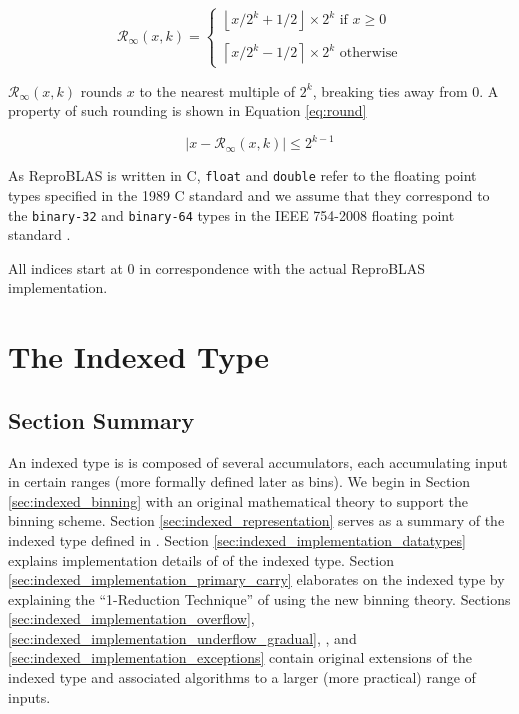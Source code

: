 \documentclass[12pt]{article}
\providecommand{\ceil}[1]{\left \lceil #1 \right \rceil }
\providecommand{\floor}[1]{\left \lfloor #1 \right \rfloor }
\providecommand{\roundtonearestinfty}{\ensuremath{\mathcal{R}_\text{$\infty$}}}
\theoremstyle{plain}
\numberwithin{equation}{section}
\begin{document}
  \begin{equation}
    \roundtonearestinfty(x, k) = \begin{cases}\floor{x/2^k + 1/2} \times 2^k \text{ if } x \geq 0\\ \\ \ceil{x/2^k - 1/2}\times 2^k \text{ otherwise}\end{cases}
  \end{equation}

  $\roundtonearestinfty(x, k)$ rounds $x$ to the nearest multiple of $2^k$, breaking ties away from 0. A property of such rounding is shown in Equation \ref{eq:round}

  \begin{equation}
    |x - \roundtonearestinfty(x, k)| \leq 2^{k - 1}
    \label{eq:round}
  \end{equation}

  As ReproBLAS is written in C, \verb|float| and \verb|double| refer to the floating point types specified in the 1989 C standard \cite{c89} and we assume that they correspond to the \verb|binary-32| and \verb|binary-64| types in the IEEE 754-2008 floating point standard \cite{ieee754}.

  All indices start at $0$ in correspondence with the actual ReproBLAS implementation.
\section{The Indexed Type}
  \subsection{Section Summary}
    An indexed type is is composed of several accumulators, each accumulating input in certain ranges (more formally defined later as bins). We begin in Section \ref{sec:indexed_binning} with an original mathematical theory to support the binning scheme. Section \ref{sec:indexed_representation} serves as a summary of the indexed type defined in \cite{repsum}.
    Section \ref{sec:indexed_implementation_datatypes} explains implementation details of \cite{repsum} of the indexed type. Section \ref{sec:indexed_implementation_primary_carry} elaborates on the indexed type by explaining the ``1-Reduction Technique'' of \cite{repsum} using the new binning theory.
    Sections \ref{sec:indexed_implementation_overflow}, \ref{sec:indexed_implementation_underflow_gradual}, \label{sec:indexed_implementation_underflow_abrupt}, and \ref{sec:indexed_implementation_exceptions} contain original extensions of the indexed type and associated algorithms to a larger (more practical) range of inputs.
\end{document}
